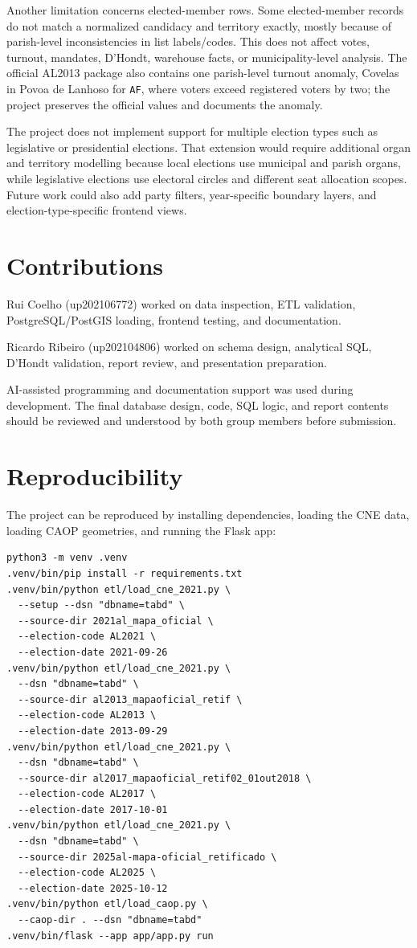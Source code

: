 \documentclass[11pt,twocolumn]{article}
\begin{document}
Another limitation concerns elected-member rows. Some elected-member records do not match a normalized candidacy and territory exactly, mostly because of parish-level inconsistencies in list labels/codes. This does not affect votes, turnout, mandates, D'Hondt, warehouse facts, or municipality-level analysis. The official AL2013 package also contains one parish-level turnout anomaly, Covelas in Povoa de Lanhoso for \texttt{AF}, where voters exceed registered voters by two; the project preserves the official values and documents the anomaly.

The project does not implement support for multiple election types such as legislative or presidential elections. That extension would require additional organ and territory modelling because local elections use municipal and parish organs, while legislative elections use electoral circles and different seat allocation scopes. Future work could also add party filters, year-specific boundary layers, and election-type-specific frontend views.

\section{Contributions}

Rui Coelho (up202106772) worked on data inspection, ETL validation, PostgreSQL/PostGIS loading, frontend testing, and documentation.

Ricardo Ribeiro (up202104806) worked on schema design, analytical SQL, D'Hondt validation, report review, and presentation preparation.

AI-assisted programming and documentation support was used during development. The final database design, code, SQL logic, and report contents should be reviewed and understood by both group members before submission.

\section{Reproducibility}

The project can be reproduced by installing dependencies, loading the CNE data, loading CAOP geometries, and running the Flask app:

\begin{verbatim}
python3 -m venv .venv
.venv/bin/pip install -r requirements.txt
.venv/bin/python etl/load_cne_2021.py \
  --setup --dsn "dbname=tabd" \
  --source-dir 2021al_mapa_oficial \
  --election-code AL2021 \
  --election-date 2021-09-26
.venv/bin/python etl/load_cne_2021.py \
  --dsn "dbname=tabd" \
  --source-dir al2013_mapaoficial_retif \
  --election-code AL2013 \
  --election-date 2013-09-29
.venv/bin/python etl/load_cne_2021.py \
  --dsn "dbname=tabd" \
  --source-dir al2017_mapaoficial_retif02_01out2018 \
  --election-code AL2017 \
  --election-date 2017-10-01
.venv/bin/python etl/load_cne_2021.py \
  --dsn "dbname=tabd" \
  --source-dir 2025al-mapa-oficial_retificado \
  --election-code AL2025 \
  --election-date 2025-10-12
.venv/bin/python etl/load_caop.py \
  --caop-dir . --dsn "dbname=tabd"
.venv/bin/flask --app app/app.py run
\end{verbatim}
\end{document}
